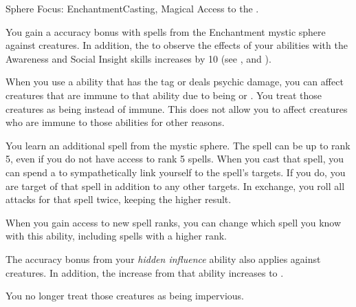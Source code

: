    \begin{magicalfeat}{Sphere Focus: Enchantment}{Casting, Magical}
        \featpre Access to the  .

         You gain a  accuracy bonus with spells from the Enchantment mystic sphere against \unaware creatures.
        In addition, the  to observe the effects of your  abilities with the Awareness and Social Insight skills increases by 10 (see , and ).

         When you use a \magical ability that has the  tag or deals psychic damage, you can affect creatures that are immune to that ability due to being  or .
        You treat those creatures as being \impervious instead of immune.
        This does not allow you to affect creatures who are immune to those abilities for other reasons.

         You learn an additional  spell from the  mystic sphere.
        The spell can be up to rank 5, even if you do not have access to rank 5 spells.
        When you cast that spell, you can spend a  to sympathetically link yourself to the spell's targets.
        If you do, you are target of that spell in addition to any other targets.
        In exchange, you roll all attacks for that spell twice, keeping the higher result.

        When you gain access to new spell ranks, you can change which spell you know with this ability, including spells with a higher rank.

         The accuracy bonus from your \textit{hidden influence} ability also applies against \partiallyunaware creatures.
        In addition, the  increase from that ability increases to .

         You no longer treat those creatures as being impervious.
    \end{magicalfeat}

